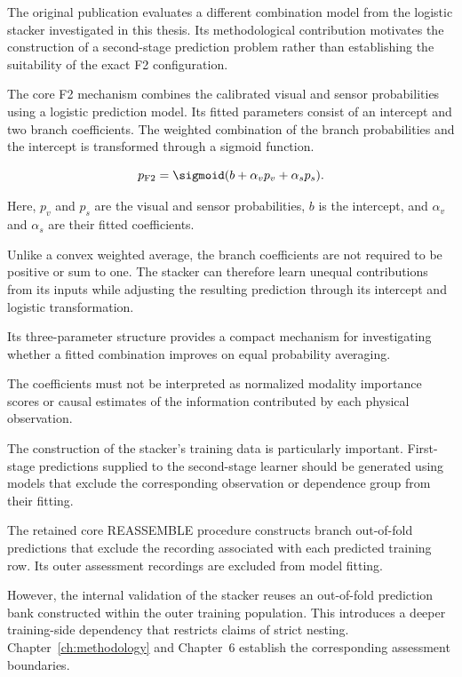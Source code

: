 The original publication evaluates a different combination model from the logistic stacker investigated in this thesis. Its methodological contribution motivates the construction of a second-stage prediction problem rather than establishing the suitability of the exact F2 configuration.

The core F2 mechanism combines the calibrated visual and sensor probabilities using a logistic prediction model. Its fitted parameters consist of an intercept and two branch coefficients. The weighted combination of the branch probabilities and the intercept is transformed through a sigmoid function.

\begin{equation}
 p_{\mathrm{F2}}=\sigmoid(b+\alpha_v p_v+\alpha_s p_s).
 \label{eq:f2}
\end{equation}

Here, \(p_v\) and \(p_s\) are the visual and sensor probabilities, \(b\) is the intercept, and \(\alpha_v\) and \(\alpha_s\) are their fitted coefficients.

Unlike a convex weighted average, the branch coefficients are not required to be positive or sum to one. The stacker can therefore learn unequal contributions from its inputs while adjusting the resulting prediction through its intercept and logistic transformation.

Its three-parameter structure provides a compact mechanism for investigating whether a fitted combination improves on equal probability averaging.

The coefficients must not be interpreted as normalized modality importance scores or causal estimates of the information contributed by each physical observation.

The construction of the stacker’s training data is particularly important. First-stage predictions supplied to the second-stage learner should be generated using models that exclude the corresponding observation or dependence group from their fitting.

The retained core REASSEMBLE procedure constructs branch out-of-fold predictions that exclude the recording associated with each predicted training row. Its outer assessment recordings are excluded from model fitting.

However, the internal validation of the stacker reuses an out-of-fold prediction bank constructed within the outer training population. This introduces a deeper training-side dependency that restricts claims of strict nesting. Chapter~\ref{ch:methodology} and Chapter~6 establish the corresponding assessment boundaries.

